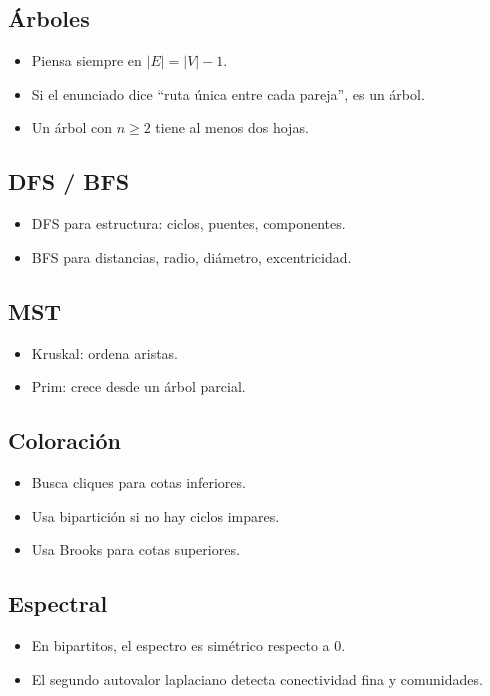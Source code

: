 \documentclass[11pt,a4paper]{article}
\begin{document}
\subsection*{Árboles}
\begin{itemize}
    \item Piensa siempre en $|E|=|V|-1$.
    \item Si el enunciado dice ``ruta única entre cada pareja'', es un árbol.
    \item Un árbol con $n\ge 2$ tiene al menos dos hojas.
\end{itemize}

\subsection*{DFS / BFS}
\begin{itemize}
    \item DFS para estructura: ciclos, puentes, componentes.
    \item BFS para distancias, radio, diámetro, excentricidad.
\end{itemize}

\subsection*{MST}
\begin{itemize}
    \item Kruskal: ordena aristas.
    \item Prim: crece desde un árbol parcial.
\end{itemize}

\subsection*{Coloración}
\begin{itemize}
    \item Busca cliques para cotas inferiores.
    \item Usa bipartición si no hay ciclos impares.
    \item Usa Brooks para cotas superiores.
\end{itemize}

\subsection*{Espectral}
\begin{itemize}
    \item En bipartitos, el espectro es simétrico respecto a $0$.
    \item El segundo autovalor laplaciano detecta conectividad fina y comunidades.
\end{itemize}
\end{document}
